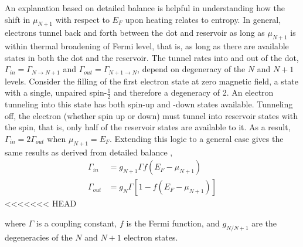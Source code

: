 \documentclass[twocolumn,showpacs,preprintnumbers,amsmath,amssymb,pra,aps,superscriptaddress]{revtex4-1}
\begin{document}
An explanation based on detailed balance is helpful in understanding how the shift in $\mu_{N+1}$ with respect to $E_F$ upon heating relates to entropy.   In general, electrons tunnel back and forth between the dot and reservoir as long as $\mu_{N+1}$ is within thermal broadening of Fermi level, that is, as long as there are available states in both the dot and the reservoir.  The tunnel rates into and out of the dot, $\Gamma_{in}=\Gamma_{N\rightarrow N+1}$ and $\Gamma_{out}=\Gamma_{N+1\rightarrow N}$, depend on degeneracy of the $N$ and $N+1$ levels.  Consider the filling of the first electron state at zero magnetic field, a state with a single, unpaired spin-$\frac{1}{2}$ and therefore a degeneracy of 2. An electron tunneling into this state has both spin-up and -down states available.  Tunneling off, the electron (whether spin up or down) must tunnel into reservoir states with the spin, that is, only half of the reservoir states are available to it. As a result, $\Gamma_{in} = 2\Gamma_{out}$ when $\mu_{N+1}=E_F$. Extending this logic to a general case gives the same results as derived from detailed balance \cite{Gustavsson2009}, 
%
\begin{align}
	\Gamma_{in} &=  g_{N+1} \Gamma f(E_F - \mu_{N+1}) \label{eqn:rates}\\
	\Gamma_{out} &= g_{N} \Gamma [1 - f(E_F - \mu_{N+1})] \nonumber
\end{align}
%
<<<<<<< HEAD

where $\Gamma$ is a coupling constant, $f$ is the Fermi function, and $g_{N/N+1}$ are the degeneracies of the $N$ and $N+1$ electron states.
\end{document}

